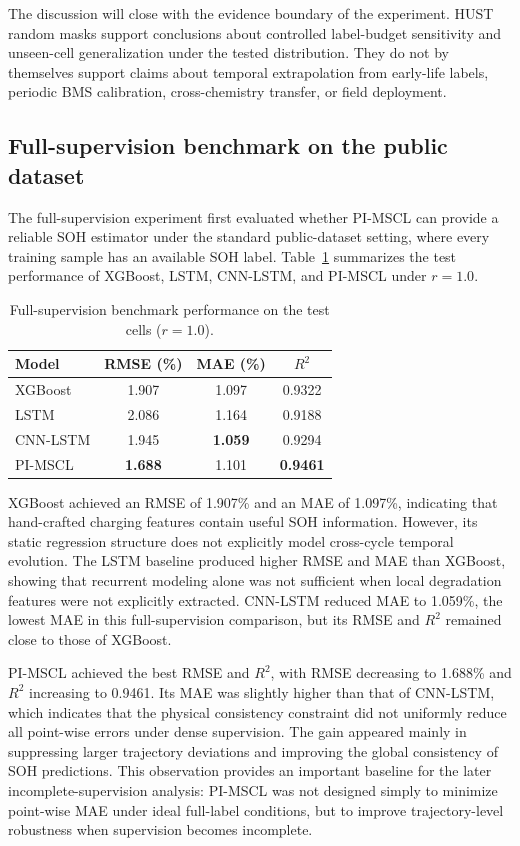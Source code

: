 \documentclass[a4paper,fleqn]{cas-dc}
\begin{document}
The discussion will close with the evidence boundary of the experiment. HUST random masks support conclusions about controlled label-budget sensitivity and unseen-cell generalization under the tested distribution. They do not by themselves support claims about temporal extrapolation from early-life labels, periodic BMS calibration, cross-chemistry transfer, or field deployment.

\iffalse
\subsection{Full-supervision benchmark on the public dataset}
\label{subsec:full_supervision_results}

The full-supervision experiment first evaluated whether PI-MSCL can provide a reliable SOH estimator under the standard public-dataset setting, where every training sample has an available SOH label. Table~\ref{tab:full_supervision} summarizes the test performance of XGBoost, LSTM, CNN-LSTM, and PI-MSCL under $r=1.0$.

\begin{table}[t]
\caption{Full-supervision benchmark performance on the test cells ($r=1.0$).}
\label{tab:full_supervision}
\centering
\begin{tabular}{lccc}
\toprule
Model & RMSE (\%) & MAE (\%) & $R^2$ \\
\midrule
XGBoost & 1.907 & 1.097 & 0.9322 \\
LSTM & 2.086 & 1.164 & 0.9188 \\
CNN-LSTM & 1.945 & \textbf{1.059} & 0.9294 \\
PI-MSCL & \textbf{1.688} & 1.101 & \textbf{0.9461} \\
\bottomrule
\end{tabular}
\end{table}

XGBoost achieved an RMSE of 1.907\% and an MAE of 1.097\%, indicating that hand-crafted charging features contain useful SOH information. However, its static regression structure does not explicitly model cross-cycle temporal evolution. The LSTM baseline produced higher RMSE and MAE than XGBoost, showing that recurrent modeling alone was not sufficient when local degradation features were not explicitly extracted. CNN-LSTM reduced MAE to 1.059\%, the lowest MAE in this full-supervision comparison, but its RMSE and $R^2$ remained close to those of XGBoost.

PI-MSCL achieved the best RMSE and $R^2$, with RMSE decreasing to 1.688\% and $R^2$ increasing to 0.9461. Its MAE was slightly higher than that of CNN-LSTM, which indicates that the physical consistency constraint did not uniformly reduce all point-wise errors under dense supervision. The gain appeared mainly in suppressing larger trajectory deviations and improving the global consistency of SOH predictions. This observation provides an important baseline for the later incomplete-supervision analysis: PI-MSCL was not designed simply to minimize point-wise MAE under ideal full-label conditions, but to improve trajectory-level robustness when supervision becomes incomplete.
\end{document}
